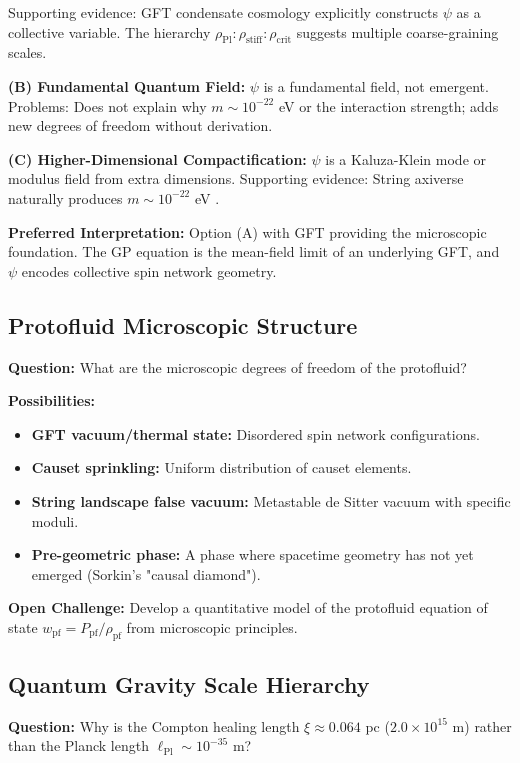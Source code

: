 \documentclass[11pt,a4paper]{article}
\newcommand{\lPl}{\ensuremath{\ell_{\mathrm{Pl}}}}
\newcommand{\rhocrit}{\ensuremath{\rho_{\mathrm{crit}}}}
\newcommand{\rhostiff}{\ensuremath{\rho_{\mathrm{stiff}}}}
\newcommand{\rhoPl}{\ensuremath{\rho_{\mathrm{Pl}}}}
\theoremstyle{definition}
\theoremstyle{remark}
\begin{document}
Supporting evidence: GFT condensate cosmology explicitly constructs $\psi$ as a collective variable. The hierarchy $\rhoPl : \rhostiff : \rhocrit$ suggests multiple coarse-graining scales.

\textbf{(B) Fundamental Quantum Field:} $\psi$ is a fundamental field, not emergent. Problems: Does not explain why $m \sim 10^{-22}$ eV or the interaction strength; adds new degrees of freedom without derivation.

\textbf{(C) Higher-Dimensional Compactification:} $\psi$ is a Kaluza-Klein mode or modulus field from extra dimensions. Supporting evidence: String axiverse naturally produces $m \sim 10^{-22}$ eV \cite{Arvanitaki2010}.

\textbf{Preferred Interpretation:} Option (A) with GFT providing the microscopic foundation. The GP equation is the mean-field limit of an underlying GFT, and $\psi$ encodes collective spin network geometry.

\subsection{Protofluid Microscopic Structure}
\label{sec:protofluid_microscopic}

\textbf{Question:} What are the microscopic degrees of freedom of the protofluid?

\textbf{Possibilities:}
\begin{itemize}
\item \textbf{GFT vacuum/thermal state:} Disordered spin network configurations.
\item \textbf{Causet sprinkling:} Uniform distribution of causet elements.
\item \textbf{String landscape false vacuum:} Metastable de Sitter vacuum with specific moduli.
\item \textbf{Pre-geometric phase:} A phase where spacetime geometry has not yet emerged (Sorkin's "causal diamond").
\end{itemize}

\textbf{Open Challenge:} Develop a quantitative model of the protofluid equation of state $w_{\mathrm{pf}} = P_{\mathrm{pf}}/\rho_{\mathrm{pf}}$ from microscopic principles.

\subsection{Quantum Gravity Scale Hierarchy}
\label{sec:hierarchy}

\textbf{Question:} Why is the Compton healing length $\xi \approx 0.064$ pc ($2.0 \times 10^{15}$ m) rather than the Planck length $\lPl \sim 10^{-35}$ m?
\end{document}
